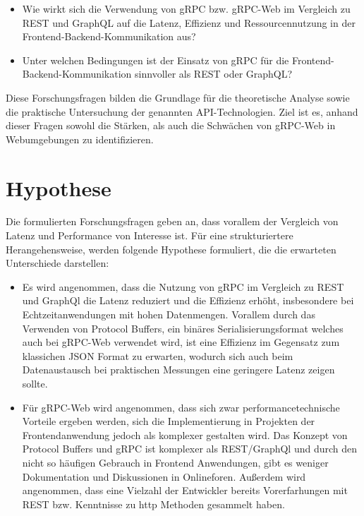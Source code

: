 \begin{itemize}
	\item Wie wirkt sich die Verwendung von gRPC bzw. gRPC-Web im Vergleich zu REST
	und GraphQL auf die Latenz, Effizienz und Ressourcennutzung in der Frontend-Backend-Kommunikation aus?
	
	\item Unter welchen Bedingungen ist der Einsatz von gRPC für die
	Frontend-Backend-Kommunikation sinnvoller als REST oder GraphQL?
	
\end{itemize}

Diese Forschungsfragen bilden die Grundlage für die theoretische Analyse sowie die praktische Untersuchung der genannten API-Technologien. Ziel ist es, anhand dieser Fragen sowohl die Stärken, als auch die Schwächen von gRPC-Web in Webumgebungen zu identifizieren.

\section{Hypothese}
Die formulierten Forschungsfragen geben an, dass vorallem der Vergleich von Latenz und Performance von Interesse ist. Für eine strukturiertere Herangehensweise, werden folgende Hypothese formuliert, die die erwarteten Unterschiede darstellen:

\begin{itemize}
	\item Es wird angenommen, dass die Nutzung von gRPC im Vergleich zu REST und GraphQl die Latenz reduziert und die Effizienz erhöht, insbesondere bei Echtzeitanwendungen mit hohen Datenmengen. Vorallem durch das Verwenden von Protocol Buffers, ein binäres Serialisierungsformat welches auch bei gRPC-Web verwendet wird, ist eine Effizienz im Gegensatz zum klassichen JSON Format zu erwarten, wodurch sich auch beim Datenaustausch bei praktischen Messungen eine geringere Latenz zeigen sollte.
	
	\item Für gRPC-Web wird angenommen, dass sich zwar performancetechnische Vorteile ergeben werden, sich die Implementierung in Projekten der Frontendanwendung jedoch als komplexer gestalten wird. Das Konzept von Protocol Buffers und gRPC ist komplexer als REST/GraphQl und durch den nicht so häufigen Gebrauch in Frontend Anwendungen, gibt es weniger Dokumentation und Diskussionen in Onlineforen. 
	Außerdem wird angenommen, dass eine Vielzahl der Entwickler bereits Vorerfarhungen mit REST bzw. Kenntnisse zu http Methoden  gesammelt haben.

	
\end{itemize}

